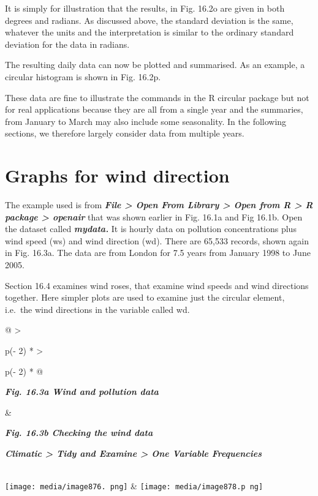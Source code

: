 \documentclass[
  letterpaper,
  DIV=11,
  numbers=noendperiod]{scrreprt}
\begin{document}
It is simply for illustration that the results, in Fig. 16.2o are given
in both degrees and radians. As discussed above, the standard deviation
is the same, whatever the units and the interpretation is similar to the
ordinary standard deviation for the data in radians.

The resulting daily data can now be plotted and summarised. As an
example, a circular histogram is shown in Fig. 16.2p.

These data are fine to illustrate the commands in the R circular package
but not for real applications because they are all from a single year
and the summaries, from January to March may also include some
seasonality. In the following sections, we therefore largely consider
data from multiple years.

\section{Graphs for wind direction}\label{graphs-for-wind-direction}

The example used is from \textbf{\emph{File \textgreater{} Open From
Library \textgreater{} Open from R \textgreater{} R package
\textgreater{} openair}} that was shown earlier in Fig. 16.1a and Fig
16.1b. Open the dataset called \textbf{\emph{mydata.}} It is hourly data
on pollution concentrations plus wind speed (ws) and wind direction
(wd). There are 65,533 records, shown again in Fig. 16.3a. The data are
from London for 7.5 years from January 1998 to June 2005.

Section 16.4 examines wind roses, that examine wind speeds and wind
directions together. Here simpler plots are used to examine just the
circular element, i.e.~the wind directions in the variable called wd.

\begin{longtable}[]{@{}
  >{\raggedright\arraybackslash}p{(\columnwidth - 2\tabcolsep) * }
  >{\raggedright\arraybackslash}p{(\columnwidth - 2\tabcolsep) * }@{}}
\toprule\noalign{}
\begin{minipage}[b]{\linewidth}\raggedright
\textbf{\emph{Fig. 16.3a Wind and pollution data}}
\end{minipage} & \begin{minipage}[b]{\linewidth}\raggedright
\textbf{\emph{Fig. 16.3b Checking the wind data}}

\textbf{\emph{Climatic \textgreater{} Tidy and Examine \textgreater{}
One Variable Frequencies}}
\end{minipage} \\
\midrule\noalign{}
\endhead
\bottomrule\noalign{}
\endlastfoot
\texttt{[image: media/image876. png]}
&
\texttt{[image: media/image878.p ng]} \\
\end{longtable}
\end{document}
